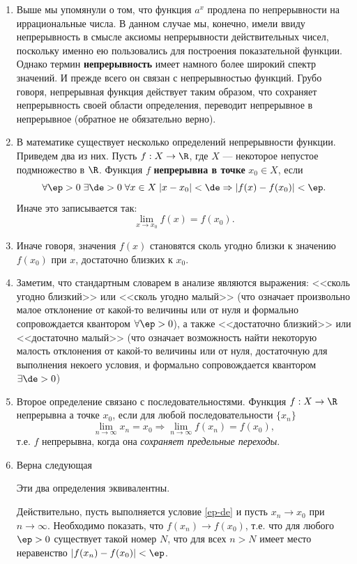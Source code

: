 \begin{enumerate}
\item Выше мы упомянули о том, что функция $a^x$ продлена по непрерывности на иррациональные числа. В данном случае мы, конечно, имели ввиду непрерывность в смысле аксиомы непрерывности действительных чисел, поскольку именно ею пользовались для построения показательной функции. Однако термин \textbf{непрерывность} имеет намного более широкий спектр значений. И прежде всего он связан с непрерывностью функций. Грубо говоря, непрерывная функция действует таким образом, что сохраняет непрерывность своей области определения, переводит непрерывное в непрерывное (обратное не обязательно верно).
\item В математике существует несколько определений непрерывности функции. Приведем два из них. Пусть $f:X\to\R$, где $X$ --- некоторое непустое подмножество в $\R$. Функция $f$ \textbf{непрерывна в точке} $x_0\in X$, если
\begin{equation}\label{ep-de}
\forall\ep>0 \; \exists\de>0\;\forall x\in X\;|x-x_0|<\de\Rightarrow |f(x)-f(x_0)|<\ep.
\end{equation}
Иначе это записывается так:
$$
\lim_{x\to x_0}f(x)=f(x_0).
$$

\item Иначе говоря, значения $f(x)$ становятся сколь угодно близки к значению $f(x_0)$ при $x$, достаточно близких к $x_0$.
\item Заметим, что стандартным словарем в анализе являются выражения: <<сколь угодно близкий>> или <<сколь угодно малый>> (что означает произвольно малое отклонение от какой-то величины или от нуля и формально сопровождается квантором $\forall\ep>0$), а также <<достаточно близкий>> или <<достаточно малый>> (что означает возможность найти некоторую малость отклонения от какой-то величины или от нуля, достаточную для выполнения некоего условия, и формально сопровождается квантором $\exists\de>0$)
\item Второе определение связано с последовательностями. Функция $f:X\to\R$ непрерывна а точке $x_0$, если для любой последовательности $\{x_n\}$ 
\begin{equation}\label{seq}
\lim_{n\to\infty}x_n=x_0\Rightarrow \lim_{n\to\infty}f(x_n)=f(x_0),
\end{equation}
т.е. $f$ непрерывна, когда она \textit{сохраняет предельные переходы}.
\item Верна следующая
\begin{thrm}Эти два определения эквивалентны.\end{thrm}
\pf
Действительно, пусть выполняется условие \eqref{ep-de} и пусть $x_n\to x_0$ при $n\to\infty$. Необходимо показать, что $f(x_n)\to f(x_0)$, т.е. что для любого $\ep>0$ существует такой номер $N$, что для всех $n>N$ имеет место неравенство $|f(x_n)-f(x_0)|<\ep$.


\end{enumerate}
